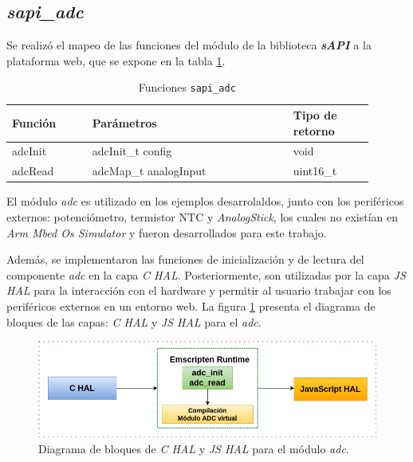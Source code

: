 \subsection{\textit{\textbf{sapi\_adc}}}

Se realizó el mapeo de las funciones del módulo de la biblioteca \textit{\textbf{sAPI}} a la plataforma web, que se expone en la tabla \ref{tab:sapiADC}.

\begin{table}[h]
	\centering
	\caption[Funciones \texttt{sapi\_adc}]{Funciones \texttt{sapi\_adc}}
	\begin{tabular}{p{0.20\linewidth} p{0.50\linewidth}  p{0.20\linewidth}}    
		\toprule
		\textbf{Función} 	 & \textbf{Parámetros} 		& \textbf{Tipo de retorno}  \\
		\midrule
		adcInit & adcInit\_t config		&  void \\		
		adcRead	 & adcMap\_t analogInput	&  uint16\_t \\
		\bottomrule
		\hline
	\end{tabular}
	\label{tab:sapiADC}
\end{table}

El módulo \textit{adc} es utilizado en los ejemplos desarrolaldos, junto con los periféricos externos: potenciómetro, termistor NTC y \textit{AnalogStick}, los cuales no existían en \textit{Arm Mbed Os Simulator} y fueron desarrollados para este trabajo.

Además, se implementaron las funciones de inicialización y de lectura del componente \textit{adc} en la capa \textit{C HAL}. Posteriormente, son utilizadas por la capa \textit{JS HAL} para la interacción con el hardware y permitir al usuario trabajar con los periféricos externos en un entorno web. La figura \ref{fig:adcEmscripten} presenta el diagrama de bloques de las capas: \textit{C HAL} y \textit{JS HAL} para el \textit{adc}.

\begin{figure}[ht]
	\centering
	\includegraphics[scale=.52]{./Figures/adcEmscripten.png}
	\caption{Diagrama de bloques de \textit{C HAL} y \textit{JS HAL} para el módulo \textit{adc}.}
	\label{fig:adcEmscripten}
\end{figure}

